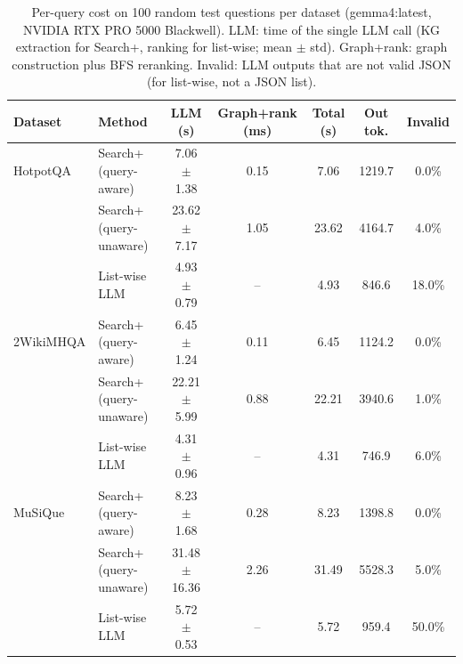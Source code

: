 \begin{table}[t]
\centering
\footnotesize
\setlength{\tabcolsep}{3pt}
\begin{tabular}{llccccc}
\toprule
\textbf{Dataset} & \textbf{Method} & \textbf{LLM (s)} & \textbf{Graph+rank (ms)} & \textbf{Total (s)} & \textbf{Out tok.} & \textbf{Invalid}\\
\midrule
HotpotQA & Search+ (query-aware) & 7.06 $\pm$ 1.38 & 0.15 & 7.06 & 1219.7 & 0.0\%\\
 & Search+ (query-unaware) & 23.62 $\pm$ 7.17 & 1.05 & 23.62 & 4164.7 & 4.0\%\\
 & List-wise LLM & 4.93 $\pm$ 0.79 & -- & 4.93 & 846.6 & 18.0\%\\
\midrule
2WikiMHQA & Search+ (query-aware) & 6.45 $\pm$ 1.24 & 0.11 & 6.45 & 1124.2 & 0.0\%\\
 & Search+ (query-unaware) & 22.21 $\pm$ 5.99 & 0.88 & 22.21 & 3940.6 & 1.0\%\\
 & List-wise LLM & 4.31 $\pm$ 0.96 & -- & 4.31 & 746.9 & 6.0\%\\
\midrule
MuSiQue & Search+ (query-aware) & 8.23 $\pm$ 1.68 & 0.28 & 8.23 & 1398.8 & 0.0\%\\
 & Search+ (query-unaware) & 31.48 $\pm$ 16.36 & 2.26 & 31.49 & 5528.3 & 5.0\%\\
 & List-wise LLM & 5.72 $\pm$ 0.53 & -- & 5.72 & 959.4 & 50.0\%\\
\bottomrule
\end{tabular}
\caption{Per-query cost on 100 random test questions per dataset (gemma4:latest, NVIDIA RTX PRO 5000 Blackwell). LLM: time of the single LLM call (KG extraction for Search+, ranking for list-wise; mean $\pm$ std). Graph+rank: graph construction plus BFS reranking. Invalid: LLM outputs that are not valid JSON (for list-wise, not a JSON list).}
\label{tab:latency}
\end{table}
